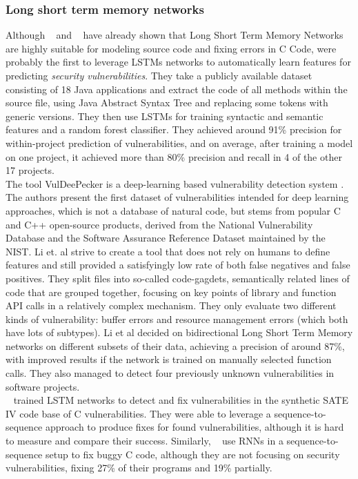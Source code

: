 \documentclass[
a4paper,
pagesize,
pdftex,
12pt,
twoside, %
BCOR=5mm, %
ngerman,
fleqn,
final,
]{scrartcl}
\begin{document}
	\subsubsection{Long short term memory networks}
	Although ~\cite{Gupta.2017b} and ~\cite{Dam.2016b} have already shown that Long Short Term Memory Networks are highly suitable for modeling source code and fixing errors in C Code, \cite{Dam.2017} were probably the first to leverage LSTMs networks to automatically learn features for predicting \textit{security vulnerabilities}. They take a publicly available dataset consisting of 18 Java applications and extract the code of all methods within the source file, using Java Abstract Syntax Tree and replacing some tokens with generic versions. They then use LSTMs for training syntactic and semantic features and a random forest classifier. They achieved around 91\% precision for within-project prediction of vulnerabilities, and on average, after training a model on one project, it achieved more than 80\% precision and recall in 4 of the other 17 projects.\\
	The tool VulDeePecker is a deep-learning based vulnerability detection system \cite{Li.2018}. The authors present the first dataset of vulnerabilities intended for deep learning approaches, which is not a database of natural code, but stems from popular C and C++ open-source products, derived from the National Vulnerability Database and the Software Assurance Reference Dataset maintained by the NIST. Li et. al strive to create a tool that does not rely on humans to define features and still provided a satisfyingly low rate of both false negatives and false positives. They split files into so-called code-gagdets, semantically related lines of code that are grouped together, focusing on key points of library and function API calls in a relatively complex mechanism. They only evaluate two different kinds of vulnerability: buffer errors and resource management errors (which both have lots of subtypes). Li et al decided on bidirectional Long Short Term Memory networks on different subsets of their data, achieving a precision of around 87\%, with improved results if the network is trained on manually selected function calls. They also managed to detect four previously unknown vulnerabilities in software projects. \\
	~\cite{Harer.2018} trained LSTM networks to detect and fix vulnerabilities in the synthetic SATE IV code base of C vulnerabilities. They were able to leverage a sequence-to-sequence approach to produce fixes for found vulnerabilities, although it is hard to measure and compare their success. Similarly, ~\cite{Gupta.2017} use RNNs in a sequence-to-sequence setup to fix buggy C code, although they are not focusing on security vulnerabilities, fixing 27\% of their programs and 19\% partially.
	
\end{document}
